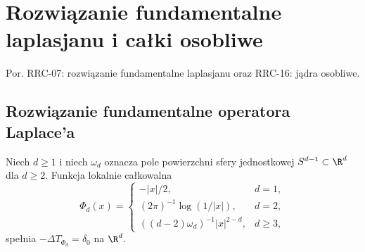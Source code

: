 \setcounter{section}{30}
\section{Rozwiązanie fundamentalne laplasjanu i całki osobliwe}
\label{sec:dt-singular}
\providecommand{\atlasref}[2]{#2}
Por. \atlasref{PDE-07::thm:pde7-laplace}{RRC-07: rozwiązanie fundamentalne laplasjanu}
oraz \atlasref{PDE-16::lem:pde16-distr-kernel}{RRC-16: jądra osobliwe}.
\subsection{Rozwiązanie fundamentalne operatora Laplace'a}
\begin{twierdzenie}
\label{thm:dt-laplace}
Niech $d\ge1$ i niech $\omega_d$ oznacza pole powierzchni
sfery jednostkowej $S^{d-1}\subset\R^d$ dla $d\ge2$.
Funkcja lokalnie całkowalna
\begin{equation}\label{eq:dt-laplace-fundamental}
 \Phi_d(x)=\begin{cases}
 -|x|/2,&d=1,\\
 (2\pi)^{-1}\log(1/|x|),&d=2,\\
 ((d-2)\omega_d)^{-1}|x|^{2-d},&d\ge3,
 \end{cases}
\end{equation}
spełnia $-\Delta T_{\Phi_d}=\delta_0$ na $\R^d$.
\end{twierdzenie}
